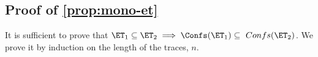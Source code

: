 
\subsection{Proof of \cref{prop:mono-et} }
\label{sec:mono-et}
It is sufficient to prove that \(\ET_1 \subseteq \ET_2 \implies \Confs(\ET_1) \subseteq\ Confs(\ET_2) \).
We prove it by induction on the length of the traces, \( n \).

